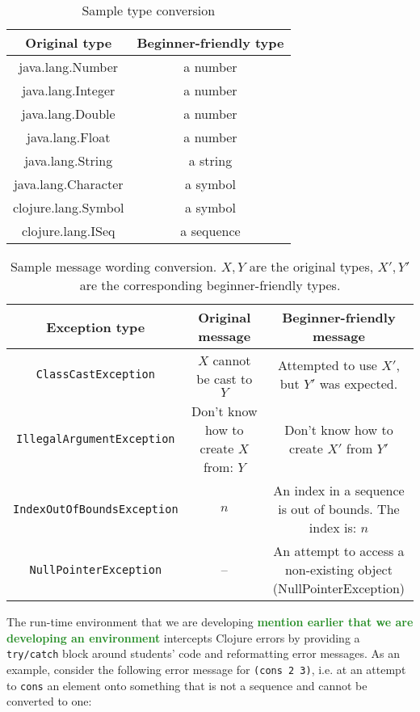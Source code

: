 \documentclass[submission,copyright,creativecommons]{eptcs}
\newcommand{\allcomments}[1]{{#1}}
\newcommand{\elenacomment}[1]{{\bf \textcolor{ForestGreen}{\allcomments{{#1}}}}}
\begin{document}
\begin{table}
\centering
\begin{tabular}{|c|c|}
\hline
Original type & Beginner-friendly type \\
\hline
java.lang.Number & a number \\
java.lang.Integer & a number \\
java.lang.Double  & a number \\
java.lang.Float & a number \\
java.lang.String & a string \\
java.lang.Character & a symbol \\
clojure.lang.Symbol  & a symbol \\
clojure.lang.ISeq & a sequence \\
\hline
\end{tabular}
\caption{Sample type conversion}\label{table:types}

\end{table}

 \begin{table}
\begin{tabular}{|c|c|c|}
\hline
Exception type & Original message & Beginner-friendly message \\
\hline 
{\tt ClassCastException} & $X$ cannot be cast to $Y$ & {\parbox{5cm}{Attempted to use $X'$, \\ 
but $Y'$ was expected.}} \\[0.3cm]
\hline
{\tt IllegalArgumentException} & 
Don't know how to create $X$ from:  $Y$ & 
{\parbox{5cm}{Don't know how to \\ create  $X'$ from $Y'$}} \\[0.3cm]
\hline
{\tt IndexOutOfBoundsException} & $n$ & {\parbox{5cm}{An index in a sequence \\ 
is out of bounds. The index is: $n$}} \\[0.3cm]
\hline
{\tt NullPointerException} & -- &  {\parbox{5cm}{An attempt to access a 
\\ non-existing object
\\ (NullPointerException)}} \\[0.3cm]
\hline
\end{tabular}
\caption{Sample message wording conversion. $X,Y$ are the original types, $X',Y'$ are the corresponding beginner-friendly types. }\label{table:messages}
\end{table}

The run-time environment that we are developing \elenacomment{mention earlier that we are developing an environment} intercepts Clojure errors by providing a {\tt try/catch} block around students' code and reformatting error messages. 
As an example, consider the following error message for {\tt (cons 2 3)}, i.e. at an attempt to {\tt cons} an element onto something that is not a sequence and cannot be converted to one:
\end{document}
